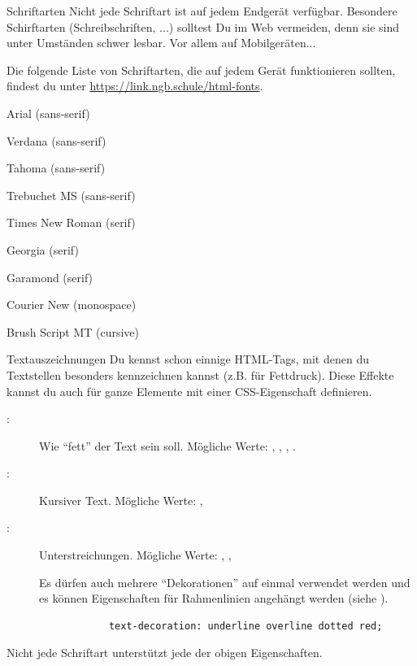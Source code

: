 \documentclass[lerntheke,12pt,a5paper,landscape]{arbeitsblatt}
\begin{document}
\begin{loesungskarte}{Schriftarten}
	Nicht jede Schriftart ist auf jedem Endgerät verfügbar. Besondere Schirftarten (Schreibschriften, ...) solltest Du im Web vermeiden, denn sie sind unter Umständen schwer lesbar. Vor allem auf Mobilgeräten...

	Die folgende Liste von Schriftarten, die auf jedem Gerät funktionieren sollten, findest du unter \url{https://link.ngb.schule/html-fonts}.

	\begin{smallitem}
		\item Arial (sans-serif)
		\item Verdana (sans-serif)
		\item Tahoma (sans-serif)
		\item Trebuchet MS (sans-serif)
		\item Times New Roman (serif)
		\item Georgia (serif)
		\item Garamond (serif)
		\item Courier New (monospace)
		\item Brush Script MT (cursive)
	\end{smallitem}
\end{loesungskarte}

\begin{karte2}{Textauszeichnungen}
	Du kennst schon einnige HTML-Tags, mit denen du Textstellen besonders kennzeichnen kannst (z.B.  für Fettdruck). Diese Effekte kannst du auch für ganze Elemente mit einer CSS-Eigenschaft definieren.

	\begin{description}
		\item[:] Wie \enquote{fett} der Text sein soll. Mögliche Werte: , , , .
		\item[:] Kursiver Text. Mögliche Werte: , 
		\item[:] Unterstreichungen. Mögliche Werte: , , 

		Es dürfen auch mehrere \enquote{Dekorationen} auf einmal verwendet werden und es können Eigenschaften für Rahmenlinien angehängt werden (siehe ).
		\begin{verbatim}
			text-decoration: underline overline dotted red;
		\end{verbatim}
	\end{description}

	Nicht jede Schriftart unterstützt jede der obigen Eigenschaften.
\end{karte2}
\end{document}
